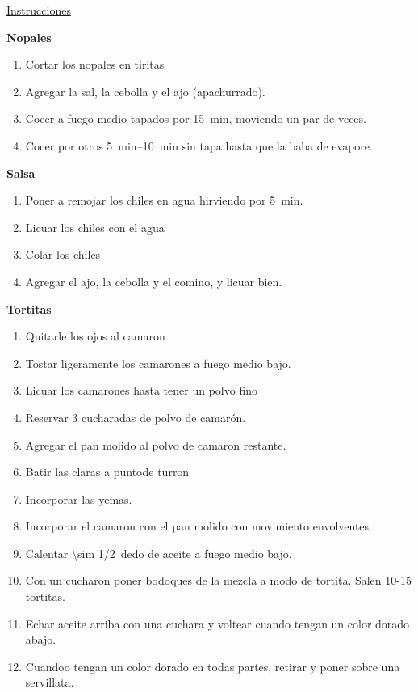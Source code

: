 \underline{Instrucciones}

\textbf{Nopales}
\begin{enumerate}
\item Cortar los nopales en tiritas
\item Agregar la sal, la cebolla y el ajo (apachurrado).
\item Cocer a fuego medio tapados por \SI{15}{min}, moviendo un par de veces.
\item Cocer por otros \SIrange{5}{10}{min} sin tapa hasta que la baba de evapore.
\end{enumerate}

\textbf{Salsa}
\begin{enumerate}
\item Poner a remojar los chiles en agua hirviendo por \SI{5}{min}.
\item Licuar los chiles con el agua
\item Colar los chiles
\item Agregar el ajo, la cebolla y el comino, y licuar bien.
\end{enumerate}

\textbf{Tortitas}
\begin{enumerate}
\item Quitarle los ojos al camaron
\item Tostar ligeramente los camarones a fuego medio bajo.
\item Licuar los camarones hasta tener un polvo fino
\item Reservar 3 cucharadas de polvo de camarón.
\item Agregar el pan molido al polvo de camaron restante.
\item Batir las claras a puntode  turron
\item Incorporar las yemas.
\item Incorporar el camaron con el pan molido con movimiento envolventes.
\item Calentar \SI{\sim 1/2}{dedo} de aceite a fuego medio bajo.
\item Con un cucharon poner bodoques de la mezcla a modo de tortita. Salen 10-15 tortitas.
\item Echar aceite arriba con una cuchara y voltear cuando tengan un color dorado abajo.
\item Cuandoo tengan un color dorado en todas partes, retirar y poner sobre una servillata.
\end{enumerate}

